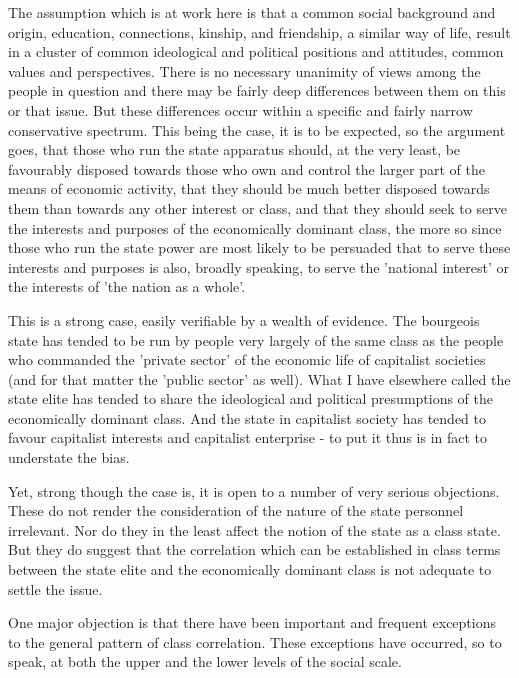 The assumption which is at work here is that a common social background and origin, education, connections, kinship, and friendship, a similar way of life, result in a cluster of common ideological and political positions and attitudes, common values and perspectives. There is no necessary unanimity of views among the people in question and there may be fairly deep differences between them on this or that issue. But these differences occur within a specific and fairly narrow conservative spectrum. This being the case, it is to be expected, so the argument goes, that those who run the state apparatus should, at the very least, be favourably disposed towards those who own and control the larger part of the means of economic activity, that they should be much better disposed towards them than towards any other interest or class, and that they should seek to serve the interests and purposes of the economically dominant class, the more so since those who run the state power are most likely to be persuaded that to serve these interests and purposes is also, broadly speaking, to serve the 'national interest' or the interests of 'the nation as a whole'.

This is a strong case, easily verifiable by a wealth of evidence. The bourgeois state has tended to be run by people very largely of the same class as the people who commanded the 'private sector' of the economic life of capitalist societies (and for that matter the 'public sector' as well). What I have elsewhere called the state elite has tended to share the ideological and political presumptions of the economically dominant class. And the state in capitalist society has tended to favour capitalist interests and capitalist enterprise - to put it thus is in fact to understate the bias.

Yet, strong though the case is, it is open to a number of very serious objections. These do not render the consideration of the nature of the state personnel irrelevant. Nor do they in the least affect the notion of the state as a class state. But they do suggest that the correlation which can be established in class terms between the state elite and the economically dominant class is not adequate to settle the issue.

One major objection is that there have been important and frequent exceptions to the general pattern of class correlation. These exceptions have occurred, so to speak, at both the upper and the lower levels of the social scale.

